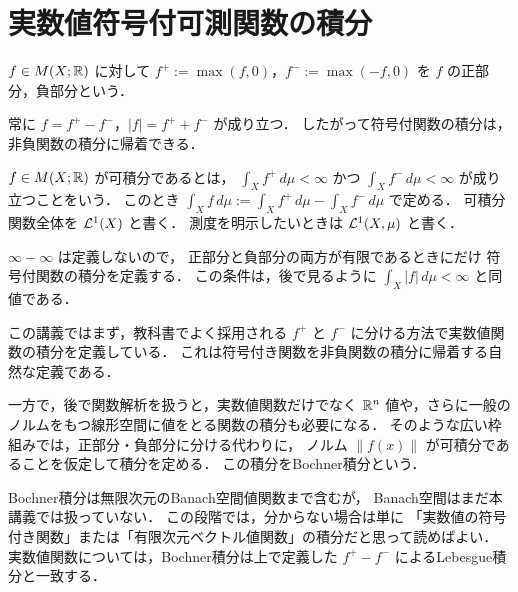 \section{実数値符号付可測関数の積分}

\begin{definition}[正部分と負部分]\label{def:positive-negative-parts}
$f\in M(X;\mathbb R)$ に対して
$f^+:=\max(f,0)$，$f^-:=\max(-f,0)$ を $f$ の正部分，負部分という．
\end{definition}

\begin{remark}
常に $f=f^+-f^-$，$|f|=f^++f^-$ が成り立つ．
したがって符号付関数の積分は，
非負関数の積分に帰着できる．
\end{remark}

\begin{definition}[可積分関数]\label{def:lebesgue-integrable-function}
$f\in M(X;\mathbb R)$ が可積分であるとは，
$\int_X f^+\,d\mu<\infty$ かつ $\int_X f^-\,d\mu<\infty$ が成り立つことをいう．
このとき
$\int_X f\,d\mu:=\int_X f^+\,d\mu-\int_X f^-\,d\mu$ で定める．
可積分関数全体を $\mathcal L^1(X)$ と書く．
測度を明示したいときは $\mathcal L^1(X,\mu)$ と書く．
\end{definition}

\begin{remark}
$\infty-\infty$ は定義しないので，
正部分と負部分の両方が有限であるときにだけ
符号付関数の積分を定義する．
この条件は，後で見るように $\int_X |f|\,d\mu<\infty$ と同値である．
\end{remark}

\begin{remark}[Bochner積分との関係]
この講義ではまず，教科書でよく採用される
$f^+$ と $f^-$ に分ける方法で実数値関数の積分を定義している．
これは符号付き関数を非負関数の積分に帰着する自然な定義である．

一方で，後で関数解析を扱うと，実数値関数だけでなく
$\mathbb R^n$ 値や，さらに一般のノルムをもつ線形空間に値をとる関数の積分も必要になる．
そのような広い枠組みでは，正部分・負部分に分ける代わりに，
ノルム $\|f(x)\|$ が可積分であることを仮定して積分を定める．
この積分をBochner積分という．

Bochner積分は無限次元のBanach空間値関数まで含むが，
Banach空間はまだ本講義では扱っていない．
この段階では，分からない場合は単に
「実数値の符号付き関数」または「有限次元ベクトル値関数」の積分だと思って読めばよい．
実数値関数については，Bochner積分は上で定義した
$f^+-f^-$ によるLebesgue積分と一致する．
\end{remark}

